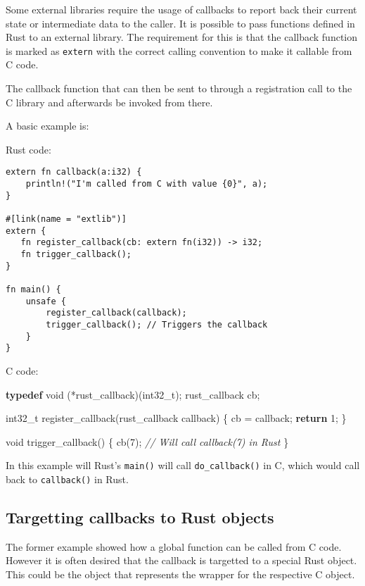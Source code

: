 \documentclass[]{article}
\newenvironment{Shaded}{}{}
\newcommand{\KeywordTok}[1]{\textcolor[rgb]{0.00,0.44,0.13}{\textbf{{#1}}}}
\newcommand{\DataTypeTok}[1]{\textcolor[rgb]{0.56,0.13,0.00}{{#1}}}
\newcommand{\DecValTok}[1]{\textcolor[rgb]{0.25,0.63,0.44}{{#1}}}
\newcommand{\CommentTok}[1]{\textcolor[rgb]{0.38,0.63,0.69}{\textit{{#1}}}}
\newcommand{\NormalTok}[1]{{#1}}
\begin{document}
Some external libraries require the usage of callbacks to report back
their current state or intermediate data to the caller. It is possible
to pass functions defined in Rust to an external library. The
requirement for this is that the callback function is marked as
\texttt{extern} with the correct calling convention to make it callable
from C code.

The callback function that can then be sent to through a registration
call to the C library and afterwards be invoked from there.

A basic example is:

Rust code:

\begin{verbatim}
extern fn callback(a:i32) {
    println!("I'm called from C with value {0}", a);
}

#[link(name = "extlib")]
extern {
   fn register_callback(cb: extern fn(i32)) -> i32;
   fn trigger_callback();
}

fn main() {
    unsafe {
        register_callback(callback);
        trigger_callback(); // Triggers the callback
    }
}
\end{verbatim}

C code:

\begin{Shaded}
\begin{Highlighting}[]
\KeywordTok{typedef} \DataTypeTok{void} \NormalTok{(*rust_callback)(}\DataTypeTok{int32_t}\NormalTok{);}
\NormalTok{rust_callback cb;}

\DataTypeTok{int32_t} \NormalTok{register_callback(rust_callback callback) \{}
    \NormalTok{cb = callback;}
    \KeywordTok{return} \DecValTok{1}\NormalTok{;}
\NormalTok{\}}

\DataTypeTok{void} \NormalTok{trigger_callback() \{}
  \NormalTok{cb(}\DecValTok{7}\NormalTok{); }\CommentTok{// Will call callback(7) in Rust}
\NormalTok{\}}
\end{Highlighting}
\end{Shaded}

In this example will Rust's \texttt{main()} will call
\texttt{do\_callback()} in C, which would call back to
\texttt{callback()} in Rust.

\subsection{Targetting callbacks to Rust
objects}\label{targetting-callbacks-to-rust-objects}

The former example showed how a global function can be called from C
code. However it is often desired that the callback is targetted to a
special Rust object. This could be the object that represents the
wrapper for the respective C object.
\end{document}
